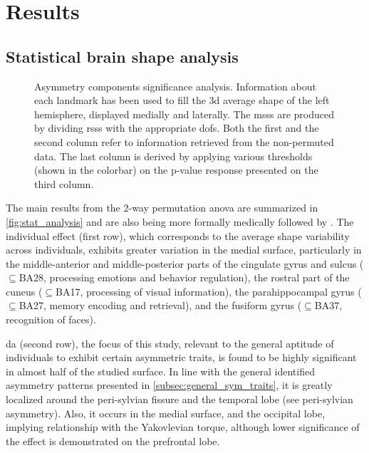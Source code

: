 \chapter{Results}\label{chap:results}
\section{Statistical brain shape analysis}

\begin{figure}[H]
	\centering
	\begin{center}
		\makebox[\textwidth]{}
	\end{center}
	\caption[Statistical brain shape analysis results]{Asymmetry components significance analysis. Information about each landmark has been used to fill the \ac{3d} average shape of the left hemisphere, displayed medially and laterally. The \acp{mss} are produced by dividing \acp{rss} with the appropriate \acp{dof}. Both the first and the second column refer to information retrieved from the non-permuted data. The last column is derived by applying various thresholds (shown in the colorbar) on the p-value response presented on the third column.}
	\label{fig:stat_analysis}	
\end{figure}

The main results from the 2-way permutation \ac{anova} are summarized in \autoref{fig:stat_analysis} and are also being more formally medically followed by \citet{Vanbiervliet2022}. The individual effect (first row), which corresponds to the average shape variability across individuals, exhibits greater variation in the medial surface, particularly in the middle-anterior and middle-posterior parts of the cingulate gyrus and sulcus ($\subseteq$BA28, processing emotions and behavior regulation), the rostral part of the cuneus ($\subseteq$BA17, processing of visual information), the parahippocampal gyrus ($\subseteq$BA27, memory encoding and retrieval), and the fusiform gyrus ($\subseteq$BA37, recognition of faces). 

\Ac{da} (second row), the focus of this study, relevant to the general aptitude of individuals to exhibit certain asymmetric traits, is found to be highly significant in almost half of the studied surface. In line with the general identified asymmetry patterns presented in \autoref{subsec:general_sym_traits}, it is greatly localized around the peri-sylvian fissure and the temporal lobe (see peri-sylvian asymmetry). Also, it occurs in the medial surface, and the occipital lobe, implying relationship with the Yakovlevian torque, although lower significance of the effect is demonstrated on the prefrontal lobe.

